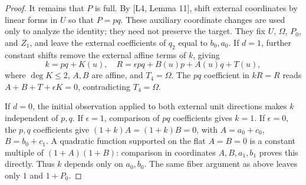 \documentclass[11pt,a4paper]{article}
\begin{document}
\begin{proof}
It remains that $P$ is full. By [L4, Lemma 11], shift external coordinates by linear forms in $U$ so that $P=pq$. These auxiliary coordinate changes are used only to analyze the identity; they need not preserve the target. They fix $U$, $\Omega$, $P_0$, and $Z_1$, and leave the external coefficients of $q_2$ equal to $b_0,a_0$. If $d=1$, further constant shifts remove the external affine terms of $k$, giving
\[
k=pq+K(u),\quad R=\epsilon pq+B(u)p+A(u)q+T(u),
\]
where $\deg K\le2$, $A,B$ are affine, and $T_4=\Omega$. The $pq$ coefficient in $kR=R$ reads $A+B+T+\epsilon K=0$, contradicting $T_4=\Omega$.

If $d=0$, the initial observation applied to both external unit directions makes $k$ independent of $p,q$. If $\epsilon=1$, comparison of $pq$ coefficients gives $k=1$. If $\epsilon=0$, the $p,q$ coefficients give $(1+k)A=(1+k)B=0$, with $A=a_0+c_0$, $B=b_0+c_1$. A quadratic function supported on the flat $A=B=0$ is a constant multiple of $(1+A)(1+B)$: comparison in coordinates $A,B,a_1,b_1$ proves this directly. Thus $k$ depends only on $a_0,b_0$. The same fiber argument as above leaves only $1$ and $1+P_0$.
\end{proof}
\end{document}
